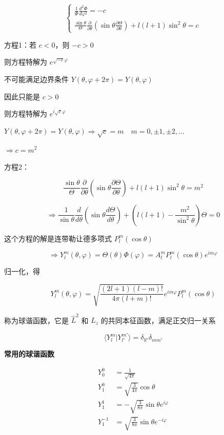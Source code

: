 \documentclass[lang=cn,10pt]{elegantbook}
\begin{document}
\[
\left\{
\begin{array}{l}
	\frac{1}{\Phi} \frac{d^2 \Phi}{d\varphi^2} = -c \\
	\frac{\sin\theta}{\Theta} \frac{\partial}{\partial \theta} \left( \sin\theta \frac{\partial \Theta}{\partial \theta} \right) + l(l+1) \sin^2\theta = c
\end{array}
\right.
\]

方程1：若 $c < 0$，则 $-c > 0$

则方程特解为 $e^{\sqrt{-c}\varphi}$

不可能满足边界条件 $Y(\theta, \varphi + 2\pi) = Y(\theta, \varphi)$

因此只能是 $c > 0$

则方程特解为 $e^{i\sqrt{c}\varphi}$

$Y(\theta, \varphi + 2\pi) = Y(\theta, \varphi) \Rightarrow \sqrt{c} = m \quad m = 0, \pm1, \pm2, \ldots$

$\Rightarrow c = m^2$

方程2：

\[
\frac{\sin\theta}{\Theta} \frac{\partial}{\partial \theta} \left( \sin\theta \frac{\partial \Theta}{\partial \theta} \right) + l(l+1) \sin^2\theta = m^2
\]

\[
\Rightarrow \frac{1}{\sin\theta} \frac{d}{d\theta} \left( \sin\theta \frac{d\Theta}{d\theta} \right) + \left( l(l+1) - \frac{m^2}{\sin^2\theta} \right) \Theta = 0
\]

这个方程的解是连带勒让德多项式 $P_l^m(\cos\theta)$

\[
\Rightarrow Y_l^m(\theta, \varphi) = \Theta(\theta) \Phi(\varphi) = A_l^m P_l^m(\cos\theta) e^{im\varphi}
\]

归一化，得

\[
Y_l^m(\theta, \varphi) = \sqrt{\frac{(2l+1)(l-m)!}{4\pi(l+m)!}} e^{im\varphi} P_l^m(\cos\theta)
\]



称为球谐函数，它是 $\hat{L}^2$ 和 $\hat{L}_z$ 的共同本征函数，满足正交归一关系

\begin{equation}
	\langle Y_{l}^{m} | Y_{l'}^{m'} \rangle = \delta_{ll'} \delta_{mm'}
\end{equation}

\textbf{常用的球谐函数}

\begin{align*}
	Y_0^0 &= \frac{1}{\sqrt{4\pi}} \\
	Y_1^0 &= \sqrt{\frac{3}{4\pi}} \cos\theta \\
	Y_1^1 &= -\sqrt{\frac{3}{8\pi}} \sin\theta e^{i\varphi} \\
	Y_1^{-1} &= \sqrt{\frac{3}{8\pi}} \sin\theta e^{-i\varphi}
\end{align*}
\end{document}
